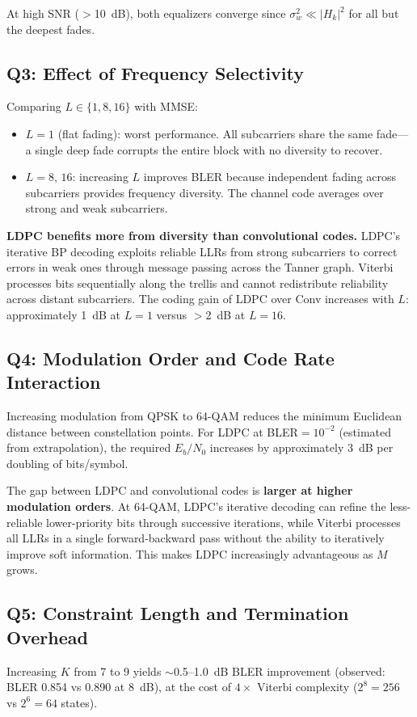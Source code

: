 \documentclass[12pt, a4paper]{article}
\begin{document}
At high SNR ($>$10~dB), both equalizers converge since $\sigma_w^2 \ll |H_k|^2$ for all but the deepest fades.

\subsection{Q3: Effect of Frequency Selectivity}
Comparing $L \in \{1, 8, 16\}$ with MMSE:
\begin{itemize}[nosep]
\item $L=1$ (flat fading): worst performance. All subcarriers share the same fade---a single deep fade corrupts the entire block with no diversity to recover.
\item $L=8,\,16$: increasing $L$ improves BLER because independent fading across subcarriers provides frequency diversity. The channel code averages over strong and weak subcarriers.
\end{itemize}

\textbf{LDPC benefits more from diversity than convolutional codes.} LDPC's iterative BP decoding exploits reliable LLRs from strong subcarriers to correct errors in weak ones through message passing across the Tanner graph. Viterbi processes bits sequentially along the trellis and cannot redistribute reliability across distant subcarriers. The coding gain of LDPC over Conv increases with $L$: approximately 1~dB at $L=1$ versus $>$2~dB at $L=16$.

\subsection{Q4: Modulation Order and Code Rate Interaction}
Increasing modulation from QPSK to 64-QAM reduces the minimum Euclidean distance between constellation points. For LDPC at BLER$=10^{-2}$ (estimated from extrapolation), the required $E_b/N_0$ increases by approximately 3~dB per doubling of bits/symbol.

The gap between LDPC and convolutional codes is \textbf{larger at higher modulation orders}. At 64-QAM, LDPC's iterative decoding can refine the less-reliable lower-priority bits through successive iterations, while Viterbi processes all LLRs in a single forward-backward pass without the ability to iteratively improve soft information. This makes LDPC increasingly advantageous as $M$ grows.

\subsection{Q5: Constraint Length and Termination Overhead}
Increasing $K$ from 7 to 9 yields $\sim$0.5--1.0~dB BLER improvement (observed: BLER 0.854 vs 0.890 at 8~dB), at the cost of $4\times$ Viterbi complexity ($2^8=256$ vs $2^6=64$ states).
\end{document}
